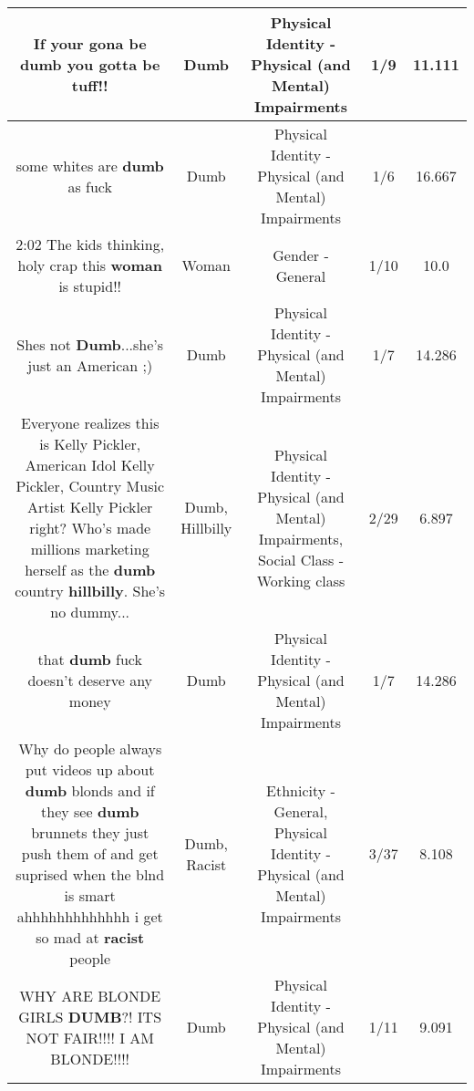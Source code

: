 \documentclass[11pt]{article}
\newlength\mylength
\begin{document}
\begin{center}
\begin{longtable}{|C{.65\mylength}|C{.30\mylength}|C{.12\mylength}|C{.12\mylength}|C{.12\mylength}|}
  \small If your gona be \textbf{dumb} you gotta be tuff!!\normalsize   & Dumb & Physical Identity - Physical (and Mental) Impairments & 1/9 & 11.111 \\  \hline
  \small some whites are \textbf{dumb} as fuck\normalsize   & Dumb & Physical Identity - Physical (and Mental) Impairments & 1/6 & 16.667 \\  \hline
  \small 2:02 The kids thinking, holy crap this \textbf{woman} is stupid!!\normalsize   & Woman & Gender - General & 1/10 & 10.0 \\  \hline
  \small Shes not \textbf{Dumb}...she's just an American ;)\normalsize   & Dumb & Physical Identity - Physical (and Mental) Impairments & 1/7 & 14.286 \\  \hline
  \small Everyone realizes this is Kelly Pickler, American Idol Kelly Pickler, Country Music Artist Kelly Pickler right?  Who's made millions marketing herself as the \textbf{dumb} country \textbf{hillbilly}.  She's no dummy...\normalsize   & Dumb, Hillbilly & Physical Identity - Physical (and Mental) Impairments, Social Class - Working class & 2/29 & 6.897 \\  \hline
  \small that \textbf{dumb} fuck doesn't deserve any money\normalsize   & Dumb & Physical Identity - Physical (and Mental) Impairments & 1/7 & 14.286 \\  \hline
  \small Why do people always put videos up about \textbf{dumb} blonds and if they see \textbf{dumb} brunnets they just push them of and get suprised when the blnd is smart ahhhhhhhhhhhhh i get so mad at \textbf{racist} people\normalsize   & Dumb, Racist & Ethnicity - General, Physical Identity - Physical (and Mental) Impairments & 3/37 & 8.108 \\  \hline
  \small WHY ARE BLONDE GIRLS \textbf{DUMB}?! ITS NOT FAIR!!!! I AM BLONDE!!!!\normalsize   & Dumb & Physical Identity - Physical (and Mental) Impairments & 1/11 & 9.091 \\  \hline

\end{longtable}
\end{center}
\end{document}
